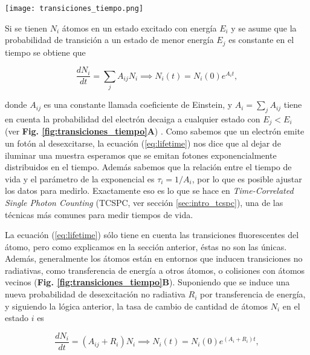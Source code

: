 \begin{SCfigure}
    \centering
    \texttt{[image: transiciones\_tiempo.png]}
    \caption{\textbf{Diagrama de Jablonski} con transiciones que contribuyen al tiempo de vida.\textbf{(A)} Sólo transiciones de fluorescencia. \textbf{(B)} Transiciones de fluorescencia y transferencia de energía. Tomado y adaptado de \cite{demtroder_emission_2010}.}
    \label{fig:transiciones_tiempo}
\end{SCfigure}

Si se tienen $N_i$ átomos en un estado excitado con energía $E_i$ y se asume que la probabilidad de transición a un estado de menor energía $E_j$ es constante en el tiempo se obtiene que

\begin{equation} \label{eq:lifetime}
    \frac{dN_i}{dt} = \sum_j A_{ij} N_i \implies N_i(t) = N_i(0)e^{A_i t},
\end{equation}

\noindent donde $A_{ij}$ es una constante llamada coeficiente de Einstein, y $A_i = \sum_{j} A_{ij}$ tiene en cuenta la probabilidad del electrón decaiga a cualquier estado con $E_j < E_i$ (ver \textbf{Fig. \ref{fig:transiciones_tiempo}A}) \cite{demtroder_emission_2010}.
Como sabemos que un electrón emite un fotón al desexcitarse, la ecuación (\ref{eq:lifetime}) nos dice que al dejar de iluminar una muestra esperamos que se emitan fotones exponencialmente distribuidos en el tiempo.
Además sabemos que la relación entre el tiempo de vida y el parámetro de la exponencial es $\tau_i = 1/A_i$, por lo que es posible ajustar los datos para medirlo.
Exactamente eso es lo que se hace en \textit{Time-Correlated Single Photon Counting} (TCSPC, ver sección \ref{sec:intro_tcspc}), una de las técnicas más comunes para medir tiempos de vida.

La ecuación (\ref{eq:lifetime}) sólo tiene en cuenta las transiciones fluorescentes del átomo, pero como explicamos en la sección anterior, éstas no son las únicas.
Además, generalmente los átomos están en entornos que inducen transiciones no radiativas, como transferencia de energía a otros átomos, o colisiones con átomos vecinos (\textbf{Fig. \ref{fig:transiciones_tiempo}B}). 
Suponiendo que se induce una nueva probabilidad de desexcitación no radiativa $R_i$ por transferencia de energía, y siguiendo la lógica anterior, la tasa de cambio de cantidad de átomos $N_i$ en el estado $i$ es

\begin{equation} \label{eq:lifetime_choques}
    \frac{dN_i}{dt} = (A_{ij} + R_i) N_i \implies N_i(t) = N_i(0)e^{(A_i + R_i) t},
\end{equation}

